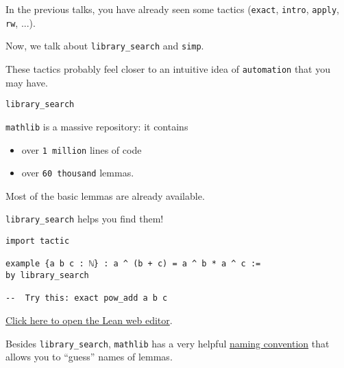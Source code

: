 \documentclass{beamer}
\begin{document}
\begin{frame}[fragile]

In the previous talks, you have already seen some tactics ({\color{violet}\verb`exact`}, {\color{violet}\verb`intro`}, {\color{violet}\verb`apply`}, {\color{violet}\verb`rw`}, ...).

Now, we talk about {\color{violet}\verb`library_search`} and {\color{violet}\verb`simp`}.

These tactics probably feel closer to an intuitive idea of {\color{violet}\verb`automation`} that you may have.
\end{frame}

\begin{frame}[fragile]{{\color{violet}\texttt{library\_search}}}

{\color{violet}\verb`mathlib`} is a massive repository: it contains
\vspace{-13pt}
\begin{itemize}
\setlength\itemsep{-12pt}
\item
  over {\color{violet}\verb`1 million`} lines of code
\item
  over {\color{violet}\verb`60 thousand`} lemmas.
\end{itemize}

Most of the basic{\footnotemark} lemmas are already available.

{\color{violet}\verb`library_search`} helps you find them!

\end{frame}

\begin{frame}[fragile]

\begin{verbatim}
import tactic

example {a b c : ℕ} : a ^ (b + c) = a ^ b * a ^ c :=
by library_search

--  Try this: exact pow_add a b c
\end{verbatim}

\vspace{-17pt}
{\small{\href{https://leanprover-community.github.io/lean-web-editor/#code=import%20tactic%0A%0Aexample%20%7Ba%20b%20c%20%3A%20%E2%84%95%7D%20%3A%20a%20%5E%20%28b%20%2B%20c%29%20%3D%20a%20%5E%20b%20*%20a%20%5E%20c%20%3A%3D%0Aby%20library_search}{Click here to open the Lean web editor}.}}

\bigskip

Besides {\color{violet}\verb`library_search`}, {\color{violet}\verb`mathlib`} has a very helpful \href{https://leanprover-community.github.io/contribute/naming.html}{naming convention} that allows you to ``guess'' names of lemmas.
\end{frame}
\end{document}
